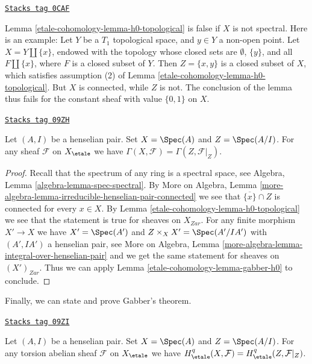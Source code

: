 \begin{example}[Quinard]
\label{etale-cohomology-example-quinard}
\href{https://stacks.math.columbia.edu/tag/0CAF}{\texttt{Stacks tag 0CAF}}

Lemma \ref{etale-cohomology-lemma-h0-topological} is false if $X$ is not spectral.
Here is an example: Let $Y$ be a $T_1$ topological space, and
$y \in Y$ a non-open point. Let $X = Y \amalg \{ x \}$, endowed with
the topology whose closed sets are $\emptyset$, $\{y\}$, and all
$F \amalg \{ x \}$, where $F$ is a closed subset of $Y$. Then
$Z = \{x, y\}$ is a closed subset of $X$, which satisfies assumption (2)
of Lemma \ref{etale-cohomology-lemma-h0-topological}. But $X$ is connected, while $Z$ is not.
The conclusion of the lemma thus fails for the constant sheaf
with value $\{0, 1\}$ on $X$.
\end{example}

\begin{lemma}
\label{etale-cohomology-lemma-h0-henselian-pair}
\href{https://stacks.math.columbia.edu/tag/09ZH}{\texttt{Stacks tag 09ZH}}

Let $(A, I)$ be a henselian pair. Set $X = \Spec(A)$ and
$Z = \Spec(A/I)$. For any sheaf $\mathcal{F}$ on $X_\etale$
we have $\Gamma(X, \mathcal{F}) = \Gamma(Z, \mathcal{F}|_Z)$.
\end{lemma}

\begin{proof}
Recall that the spectrum of any ring is a spectral space, see
Algebra, Lemma \ref{algebra-lemma-spec-spectral}. By
More on Algebra, Lemma
\ref{more-algebra-lemma-irreducible-henselian-pair-connected}
we see that $\overline{\{x\}} \cap Z$ is connected for every $x \in X$.
By Lemma \ref{etale-cohomology-lemma-h0-topological} we see that the statement
is true for sheaves on $X_{Zar}$. For any finite morphism $X' \to X$
we have $X' = \Spec(A')$ and $Z \times_X X' = \Spec(A'/IA')$
with $(A', IA')$ a henselian pair, see More on Algebra, Lemma
\ref{more-algebra-lemma-integral-over-henselian-pair}
and we get the same statement for sheaves on $(X')_{Zar}$.
Thus we can apply Lemma \ref{etale-cohomology-lemma-gabber-h0} to conclude.
\end{proof}

Finally, we can state and prove Gabber's theorem.

\begin{theorem}[Gabber]

\label{etale-cohomology-theorem-gabber}
\href{https://stacks.math.columbia.edu/tag/09ZI}{\texttt{Stacks tag 09ZI}}

Let $(A, I)$ be a henselian pair. Set $X = \Spec(A)$ and
$Z = \Spec(A/I)$. For any torsion abelian sheaf $\mathcal{F}$ on $X_\etale$
we have $H^q_\etale(X, \mathcal{F}) = H^q_\etale(Z, \mathcal{F}|_Z)$.
\end{theorem}

